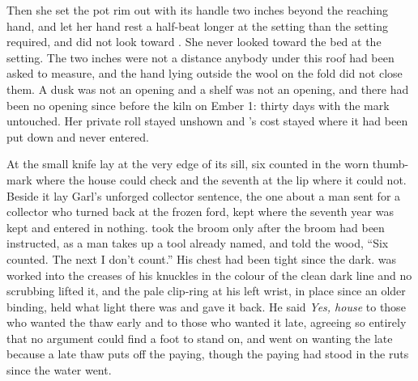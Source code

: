 Then she set the pot rim out with its handle two inches beyond the reaching hand, and let her hand rest a half-beat longer at the setting than the setting required, and did not look toward . She never looked toward the bed at the setting. The two inches were not a distance anybody under this roof had been asked to measure, and the hand lying outside the wool on the fold did not close them. A dusk was not an opening and a shelf was not an opening, and there had been no opening since before the kiln on Ember 1: thirty days with the mark untouched. Her private roll stayed unshown and 's cost stayed where it had been put down and never entered.

\scenebreak

At  the small knife lay at the very edge of its sill, six counted in the worn thumb-mark where the house could check and the seventh at the lip where it could not. Beside it lay Garl's unforged collector sentence, the one about a man sent for a collector who turned back at the frozen ford, kept where the seventh year was kept and entered in nothing.  took the broom only after the broom had been instructed, as a man takes up a tool already named, and told the wood, “Six counted. The next I don't count.” His chest had been tight since the dark.  was worked into the creases of his knuckles in the colour of the clean dark line and no scrubbing lifted it, and the pale clip-ring at his left wrist, in place since an older binding, held what light there was and gave it back. He said \emph{Yes, house} to those who wanted the thaw early and to those who wanted it late, agreeing so entirely that no argument could find a foot to stand on, and went on wanting the late because a late thaw puts off the paying, though the paying had stood in the ruts since the water went.

